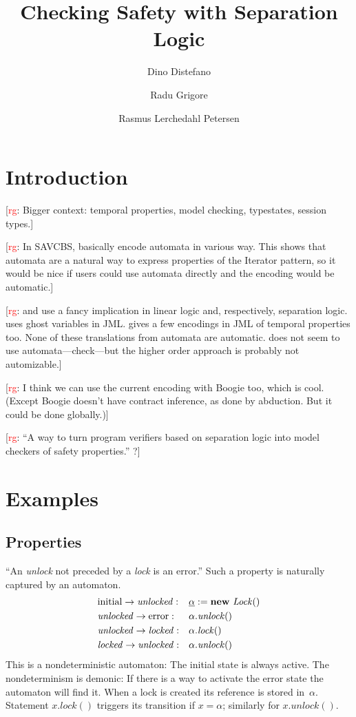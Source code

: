 \documentclass[a4paper]{article}
\title{Checking Safety with Separation Logic}
\author{Dino Distefano \and Radu Grigore \and Rasmus Lerchedahl Petersen}
\newcommand{\todo}[2]{{\small [\textcolor{red}{#1}: #2]}}
\newcommand{\rg}[1]{\todo{rg}{#1}}
\newcommand{\pat}{\underline}
\newcommand{\new}[1]{\text{\textbf{new} \textit{#1}}}
\theoremstyle{remark}
\begin{document}
\maketitle
\section{Introduction} %

\rg{Bigger context: temporal properties, model checking, typestates, session types.}

\rg{In SAVCBS, \cite{cok2006,bierhoff2006} basically encode automata in various way. This shows that automata are a natural way to express properties of the Iterator pattern, so it would be nice if users could use automata directly and the encoding would be automatic.}

\rg{\cite{bierhoff2006} and \cite{haack2009} use a fancy implication in linear logic and, respectively, separation logic. \cite{cok2006} uses ghost variables in JML. \cite{trentelman2002} gives a few encodings in JML of temporal properties too. None of these translations from automata are automatic. \cite{krishnaswami2006} does not seem to use automata---check---but the higher order approach is probably not automizable.}

\rg{I think we can use the current encoding with Boogie too, which is cool. (Except Boogie doesn't have contract inference, as done by abduction. But it could be done globally.)}

\rg{``A way to turn program verifiers based on separation logic into model checkers of safety properties.'' ?}

\section{Examples} %
\subsection{Properties}\label{sec:properties} %

``An \textit{unlock} not preceded by a \textit{lock} is an error.''
Such a property is naturally captured by an automaton.
\begin{equation}\label{eq:unlockunlock}
\begin{aligned}
&\mathrm{initial}\to\mathit{unlocked}: &&\pat\alpha := \new{Lock}()\\
&\mathit{unlocked}\to\mathrm{error}: &&\alpha.\mathit{unlock}()\\
&\mathit{unlocked}\to\mathit{locked}: &&\alpha.\mathit{lock}()\\
&\mathit{locked}\to\mathit{unlocked}: &&\alpha.\mathit{unlock}()
\end{aligned}
\end{equation}
This is a nondeterministic automaton:
The initial state is always active.
The nondeterminism is demonic:
If there is a way to activate the error state the automaton will find it.
When a lock is created its reference is stored in~$\alpha$.
Statement $x.\mathit{lock}()$ triggers its transition if $x=\alpha$;
similarly for $x.\mathit{unlock}()$.
\end{document}
